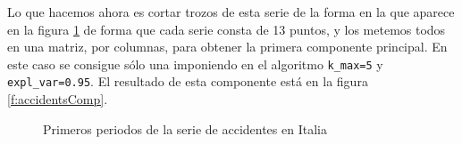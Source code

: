 Lo que hacemos ahora es cortar trozos de esta serie de la forma en la que aparece en la figura \ref{f:periodos} de forma que cada serie consta de 13 puntos, y los metemos todos en una matriz, por columnas, para obtener la primera componente principal. En este caso se consigue sólo una imponiendo en el algoritmo \texttt{k\_max=5} y \texttt{expl\_var=0.95}. El resultado de esta componente está en la figura \ref{f:accidentsComp}.

\begin{figure}[]
 \centering
 \caption{Primeros periodos de la serie de accidentes en Italia}
 \label{f:periodos}
\end{figure}

